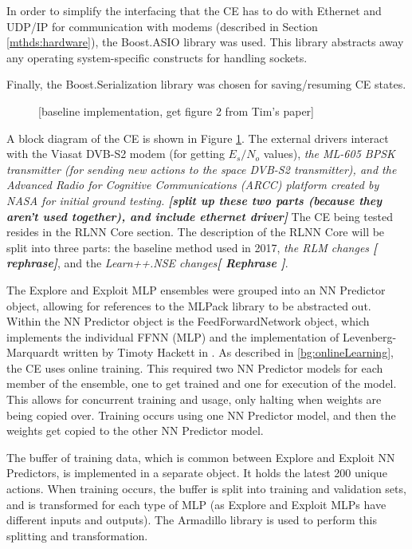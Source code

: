 \par In order to simplify the interfacing that the CE has to do with Ethernet and UDP/IP for communication with modems (described in Section \ref{mthds:hardware}), the Boost.ASIO \cite{placeholderCitation} library was used. This library abstracts away any operating system-specific constructs for handling sockets.
\par Finally, the Boost.Serialization \cite{placeholderCitation} library was chosen for saving/resuming CE states. 
\begin{figure}
\caption{[baseline implementation, get figure 2 from Tim's paper]}
\label{fig:timOutlineBlocks}
\end{figure}
\par A block diagram of the CE is shown in Figure \ref{fig:timOutlineBlocks}. The external drivers interact with the Viasat DVB-S2 modem (for getting $E_s/N_o$ values), \textit{the ML-605 BPSK transmitter (for sending new actions to the space DVB-S2 transmitter), and the Advanced Radio for Cognitive Communications (ARCC) platform created by NASA for initial ground testing. \textbf{[split up these two parts (because they aren't used together), and include ethernet driver]}} The CE being tested resides in the RLNN Core section. The description of the RLNN Core will be split into three parts: the baseline method used in 2017, \textit{the RLM changes \textbf{[ rephrase]}}, and the \textit{Learn++.NSE changes\textbf{[ Rephrase ]}}.
\par The Explore and Exploit MLP ensembles were grouped into an NN Predictor object, allowing for references to the MLPack library to be abstracted out. Within the NN Predictor object is the FeedForwardNetwork object, which implements the individual FFNN (MLP) and the implementation of Levenberg-Marquardt written by Timoty Hackett in \cite{tim_implementation_paper}. As described in \ref{bg:onlineLearning}, the CE uses online training. This required two NN Predictor models for each member of the ensemble, one to get trained and one for execution of the model. This allows for concurrent training and usage, only halting when weights are being copied over. Training occurs using one NN Predictor model, and then the weights get copied to the other NN Predictor model. 
\par The buffer of training data, which is common between Explore and Exploit NN Predictors, is implemented in a separate object. It holds the latest 200 unique actions. When training occurs, the buffer is split into training and validation sets, and is transformed for each type of MLP (as Explore and Exploit MLPs have different inputs and outputs). The Armadillo library is used to perform this splitting and transformation.
